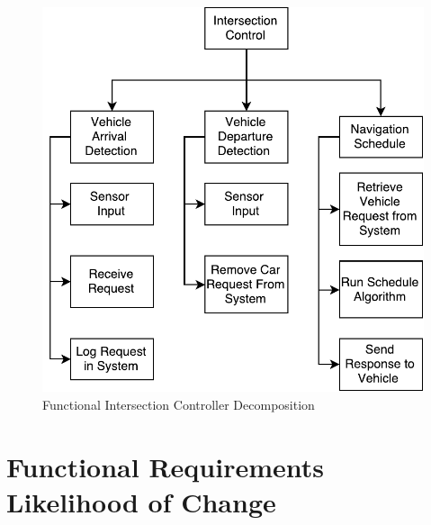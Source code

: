 \documentclass [11pt]{article}
\begin{document}
\begin{figure} [h!]
\vspace*{-5mm}
	\centering
	\includegraphics [scale =.78] {figures/function_decomp_IC.pdf}
	\caption{Functional Intersection Controller Decomposition}
\end{figure}


\section{Functional Requirements Likelihood of Change} \label{sec:changeL}
\end{document}
